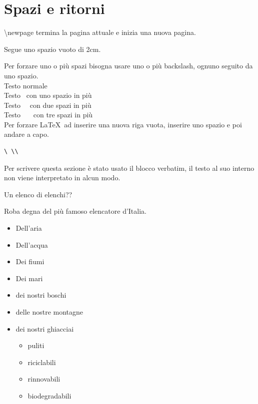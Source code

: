 \newpage
\section{Spazi e ritorni}
{\ttfamily \textbackslash newpage} termina la pagina attuale e inizia una nuova pagina.

Segue uno spazio vuoto di 2cm.

\vspace*{2cm}

Per forzare uno o più spazi bisogna usare uno o più backslash, ognuno seguito da uno spazio.\\
Testo normale\\
Testo \ con uno spazio in più\\
Testo \ \ con due spazi in più\\
Testo \ \ \ con tre spazi in più\\

Per forzare \LaTeX\ ad inserire una nuova riga vuota, inserire uno spazio e poi andare a capo.\\
\begin{verbatim}
\ \\
\end{verbatim}
Per scrivere questa sezione è stato usato il blocco {\ttfamily verbatim}, il testo al suo interno non viene
interpretato in alcun modo.



Un elenco di elenchi??

Roba degna del più famoso elencatore d'Italia.
\begin{itemize}
    \item Dell'aria
    \item Dell'acqua
    \item Dei fiumi
    \item Dei mari
    \item dei nostri boschi
    \item delle nostre montagne
    \item dei nostri ghiacciai
    \begin{itemize}
        \item puliti
        \item riciclabili
        \item rinnovabili
        \item biodegradabili
    \end{itemize}
\end{itemize}





